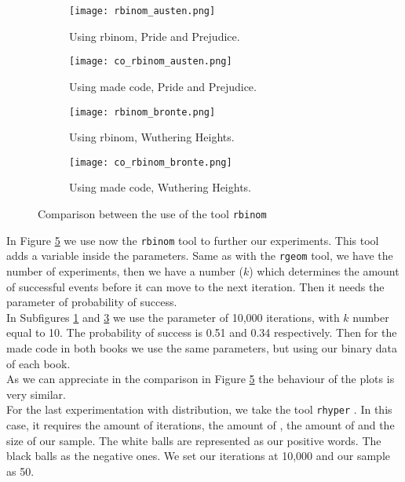 \documentclass{article}
\begin{document}
\begin{figure}[]
\begin{subfigure}{.5\textwidth}
  \centering
  \texttt{[image: rbinom\_austen.png]}  
  \caption{Using rbinom, Pride and Prejudice.}
  \label{subfig6-1}
\end{subfigure}
\begin{subfigure}{.5\textwidth}
  \centering
  \texttt{[image: co\_rbinom\_austen.png]}  
  \caption{Using made code, Pride and Prejudice.}
  \label{subfig6-2}
\end{subfigure}
\newline
\begin{subfigure}{.5\textwidth}
  \centering
  \texttt{[image: rbinom\_bronte.png]}  
  \caption{Using rbinom, Wuthering Heights.}
  \label{subfig6-3}
\end{subfigure}
\begin{subfigure}{.5\textwidth}
  \centering
  \texttt{[image: co\_rbinom\_bronte.png]}  
  \caption{Using made code, Wuthering Heights.}
  \label{subfig6-4}
\end{subfigure}
\caption{Comparison between the use of the tool \texttt{rbinom}}
\label{fig6}
\end{figure}

In Figure \ref{fig6} we use now the \texttt{rbinom} \cite{rbinom} tool to further our experiments. This tool adds a variable inside the parameters. Same as with the \texttt{rgeom} tool, we have the number of experiments, then we have a number ($k$) which determines the amount of successful events before it can move to the next iteration. Then it needs the parameter of probability of success.\\

In Subfigures \ref{subfig6-1} and \ref{subfig6-3} we use the parameter of 10,000 iterations, with $k$ number equal to 10. The probability of success is 0.51 and 0.34 respectively. Then for the made code in both books we use the same parameters, but using our binary data of each book.\\

As we can appreciate in the comparison in Figure \ref{fig6} the behaviour of the plots is very similar.\\ 

For the last experimentation with distribution, we take the tool \texttt{rhyper} \cite{rhyper}. In this case, it requires the amount of iterations, the amount of , the amount of  and the size of our sample. The white balls are represented as our positive words. The black balls as the negative ones. We set our iterations at 10,000 and our sample as 50.\\
\end{document}
